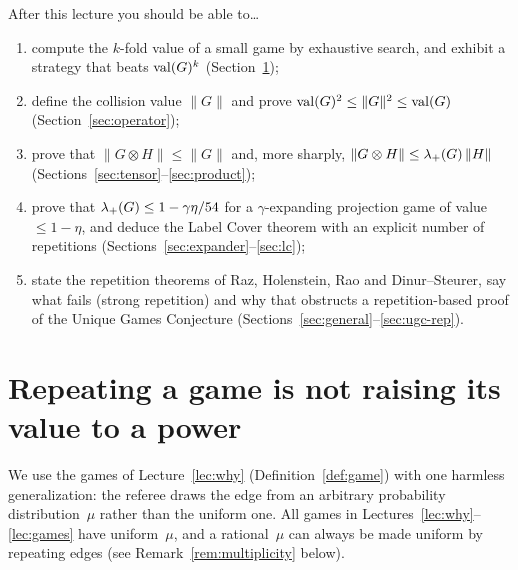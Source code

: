 \begin{goalbox}{After this lecture you should be able to\ldots}
\begin{enumerate}[leftmargin=*,label=(\arabic*)]
  \item compute the $k$-fold value of a small game by exhaustive search, and exhibit a strategy that beats $\operatorname{val}(G)^k$ (Section~\ref{sec:notpower});
  \item define the collision value $\|G\|$ and prove $\operatorname{val}(G)^2\le\|G\|^2\le\operatorname{val}(G)$ (Section~\ref{sec:operator});
  \item prove that $\|G\otimes H\|\le\|G\|$ and, more sharply, $\|G\otimes H\|\le\lambda_{+}(G)\,\|H\|$ (Sections~\ref{sec:tensor}--\ref{sec:product});
  \item prove that $\lambda_{+}(G)\le1-\gamma\eta/54$ for a $\gamma$-expanding projection game of value $\le1-\eta$, and deduce the Label Cover theorem with an explicit number of repetitions (Sections~\ref{sec:expander}--\ref{sec:lc});
  \item state the repetition theorems of Raz, Holenstein, Rao and Dinur--Steurer, say what fails (strong repetition) and why that obstructs a repetition-based proof of the Unique Games Conjecture (Sections~\ref{sec:general}--\ref{sec:ugc-rep}).
\end{enumerate}
\end{goalbox}


\section{Repeating a game is not raising its value to a power}
\label{sec:notpower}

We use the games of Lecture~\ref{lec:why} (Definition~\ref{def:game}) with one harmless generalization: the referee draws the edge from an arbitrary probability distribution~$\mu$ rather than the uniform one.
All games in Lectures~\ref{lec:why}--\ref{lec:games} have uniform~$\mu$, and a rational~$\mu$ can always be made uniform by repeating edges (see Remark~\ref{rem:multiplicity} below).

